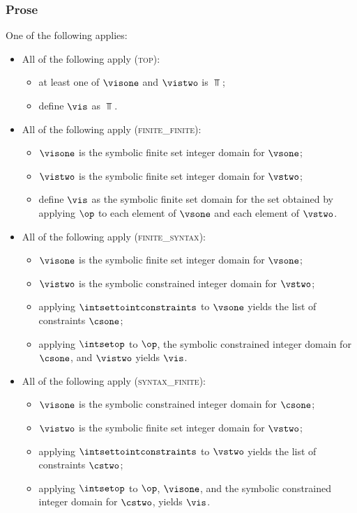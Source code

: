 \subsubsection{Prose}
One of the following applies:
\begin{itemize}
  \item All of the following apply (\textsc{top}):
  \begin{itemize}
    \item at least one of $\visone$ and $\vistwo$ is $\Top$;
    \item define $\vis$ as $\Top$.
  \end{itemize}

  \item All of the following apply (\textsc{finite\_finite}):
  \begin{itemize}
    \item $\visone$ is the symbolic finite set integer domain for $\vsone$;
    \item $\vistwo$ is the symbolic finite set integer domain for $\vstwo$;
    \item define $\vis$ as the symbolic finite set domain for the set obtained
          by applying $\op$ to each element of $\vsone$ and each element of $\vstwo$.
  \end{itemize}

  \item All of the following apply (\textsc{finite\_syntax}):
  \begin{itemize}
    \item $\visone$ is the symbolic finite set integer domain for $\vsone$;
    \item $\vistwo$ is the symbolic constrained integer domain for $\vstwo$;
    \item applying $\intsettointconstraints$ to $\vsone$ yields the list of constraints $\csone$;
    \item applying $\intsetop$ to $\op$, the symbolic constrained integer domain for $\csone$,
          and $\vistwo$ yields $\vis$.
  \end{itemize}

  \item All of the following apply (\textsc{syntax\_finite}):
  \begin{itemize}
    \item $\visone$ is the symbolic constrained integer domain for $\csone$;
    \item $\vistwo$ is the symbolic finite set integer domain for $\vstwo$;
    \item applying $\intsettointconstraints$ to $\vstwo$ yields the list of constraints $\cstwo$;
    \item applying $\intsetop$ to $\op$, $\visone$, and the symbolic constrained integer domain
          for $\cstwo$, yields $\vis$.
  \end{itemize}


\end{itemize}
